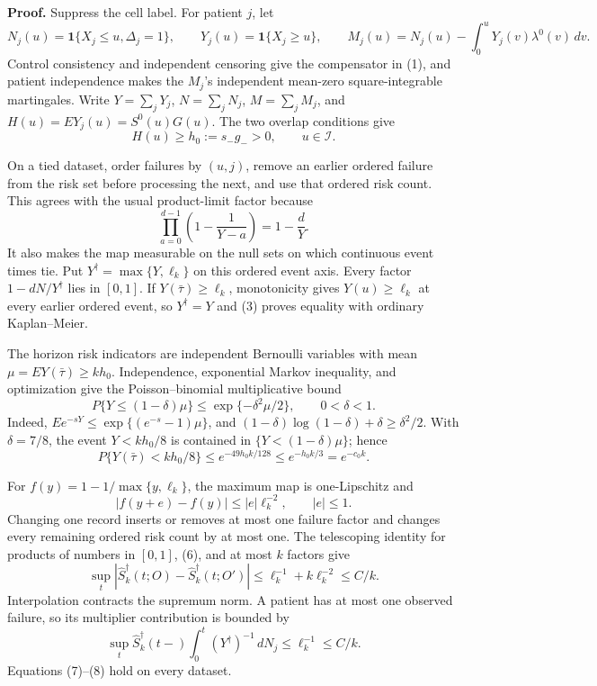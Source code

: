 \textbf{Proof.}
Suppress the cell label. For patient \(j\), let
\[
 N_j(u)=\mathbf1\{X_j\le u,\Delta_j=1\},\qquad
 Y_j(u)=\mathbf1\{X_j\ge u\},\qquad
 M_j(u)=N_j(u)-\int_0^uY_j(v)\lambda^0(v)\,dv.             \tag{1}
\]
Control consistency and independent censoring give the compensator in (1), and patient independence makes the \(M_j\)'s independent mean-zero square-integrable martingales. Write \(Y=\sum_jY_j\), \(N=\sum_jN_j\), \(M=\sum_jM_j\), and \(H(u)=EY_j(u)=S^0(u)G(u)\). The two overlap conditions give
\[
 H(u)\ge h_0:=s_-g_->0,\qquad u\in\mathcal I.             \tag{2}
\]

On a tied dataset, order failures by \((u,j)\), remove an earlier ordered failure from the risk set before processing the next, and use that ordered risk count. This agrees with the usual product-limit factor because
\[
 \prod_{a=0}^{d-1}\left(1-\frac1{Y-a}\right)=1-\frac dY.  \tag{3}
\]
It also makes the map measurable on the null sets on which continuous event times tie. Put \(Y^\dagger=\max\{Y,\ell_k\}\) on this ordered event axis. Every factor \(1-dN/Y^\dagger\) lies in \([0,1]\). If \(Y(\bar\tau)\ge\ell_k\), monotonicity gives \(Y(u)\ge\ell_k\) at every earlier ordered event, so \(Y^\dagger=Y\) and (3) proves equality with ordinary Kaplan--Meier.

The horizon risk indicators are independent Bernoulli variables with mean \(\mu=EY(\bar\tau)\ge kh_0\). Independence, exponential Markov inequality, and optimization give the Poisson--binomial multiplicative bound
\[
 P\{Y\le(1-\delta)\mu\}\le\exp\{-\delta^2\mu/2\},
 \qquad0<\delta<1.                                        \tag{4}
\]
Indeed, \(Ee^{-sY}\le\exp\{(e^{-s}-1)\mu\}\), and \((1-\delta)\log(1-\delta)+\delta\ge\delta^2/2\). With \(\delta=7/8\), the event \(Y<kh_0/8\) is contained in \(\{Y<(1-\delta)\mu\}\); hence
\[
 P\{Y(\bar\tau)<kh_0/8\}
 \le e^{-49h_0k/128}\le e^{-h_0k/3}=e^{-c_0k}.            \tag{5}
\]

For \(f(y)=1-1/\max\{y,\ell_k\}\), the maximum map is one-Lipschitz and
\[
 |f(y+e)-f(y)|\le |e|\ell_k^{-2},\qquad |e|\le1.           \tag{6}
\]
Changing one record inserts or removes at most one failure factor and changes every remaining ordered risk count by at most one. The telescoping identity for products of numbers in \([0,1]\), (6), and at most \(k\) factors give
\[
 \sup_t|\widehat S_k^\dagger(t;O)-\widehat S_k^\dagger(t;O')|
 \le \ell_k^{-1}+k\ell_k^{-2}\le C/k.                    \tag{7}
\]
Interpolation contracts the supremum norm. A patient has at most one observed failure, so its multiplier contribution is bounded by
\[
 \sup_t\widehat S_k^\dagger(t-)
 \int_0^t(Y^\dagger)^{-1}\,dN_j
 \le\ell_k^{-1}\le C/k.                                  \tag{8}
\]
Equations (7)--(8) hold on every dataset.

